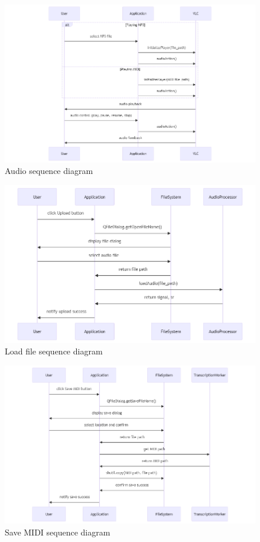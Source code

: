 \documentclass{article}
\begin{document}
\begin{figure}[htbp]
    \centering
    \includegraphics[width=\textwidth]{../diagrams/audio_seq.png}
    \caption{Audio sequence diagram}
    \label{fig:audio_sequence_diagram}
\end{figure}

\begin{figure}[htbp]
    \centering
    \includegraphics[width=\textwidth]{../diagrams/load_audio_seq.png}
    \caption{Load file sequence diagram}
    \label{fig:load_audio_sequence_diagram}
\end{figure}

\begin{figure}[htbp]
    \centering
    \includegraphics[width=\textwidth]{../diagrams/save_midi_seq.png}
    \caption{Save MIDI sequence diagram}
    \label{fig:save_midi_sequence_diagram}
\end{figure}
\end{document}
